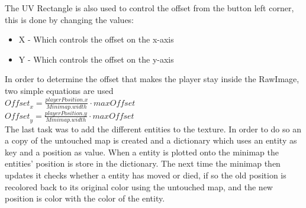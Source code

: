 The UV Rectangle is also used to control the offset from the button left corner, this is done by changing the values:
\begin{itemize}
\item X - Which controls the offset on the x-axis
\item Y - Which controls the offset on the y-axis
\end{itemize}
In order to determine the offset that makes the player stay inside the RawImage, two simple equations are used\\
$\textit{Offset}_x = \frac{playerPosition.x}{Minimap.width} \cdot \textit{maxOffset}$\\
$\textit{Offset}_y = \frac{playerPosition.y}{Minimap.width} \cdot \textit{maxOffset}$\\
The last task was to add the different entities to the texture. 
In order to do so an a copy of the untouched map is created and a dictionary which uses an entity as key and a position as value.
When a entity is plotted onto the minimap the entities' position is store in the dictionary.
The next time the minimap then updates it checks whether a entity has moved or died, if so the old position is recolored back to its original color using the untouched map, and the new position is color with the color of the entity.
